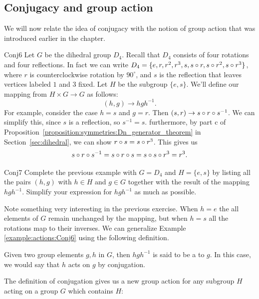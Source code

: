 \subsection{Conjugacy and group action}

We will now relate the idea of conjugacy with the notion of group action that was introduced earlier in the chapter.


\begin{example}{Conj6}
Let $G$ be the dihedral group $D_4$.  Recall that $D_4$ consists of four rotations and four reflections.  In fact we can write $D_4=\{e, r, r^2, r^3, s,s\circ r,s\circ r^2,s\circ r^3\}$, where $r$ is counterclockwise rotation by $90^{\circ}$, and $s$ is the reflection that leaves vertices labeled $1$ and $3$ fixed.  Let $H$ be the subgroup $\{e,s\}$.  
We'll define our mapping from $H\times G \rightarrow G$ as follows:
$$(h,g) \rightarrow hgh^{-1}. $$
For example, consider the case $h=s$ and $g=r$. Then $(s,r) \rightarrow s\circ r \circ s^{-1}$.  We can simplify this, since $s$ is a reflection, so $s^{-1}=s$.  furthermore, by part c of Proposition~\ref{proposition:symmetries:Dn_generator_theorem}  in Section~\ref{sec:dihedral}, we can show $r\circ s =s\circ r^3$.  This gives us
$$ s\circ r\circ s^{-1}=s\circ r\circ s=s\circ s\circ r^3=r^3.$$

\end {example}
\begin{exercise}{Conj7}
Complete the previous example with $G=D_4$ and $H=\{e,s\}$ by listing all the pairs $(h,g)$ with $h\in H$ and $g \in G$ together with the result of the mapping $hgh^{-1}$.  Simplify your expression for $hgh^{-1}$ as much as possible.
\end{exercise}
Note something very interesting in the previous exercise.  When $h=e$ the all elements of $G$ remain unchanged by the mapping, but when $h=s$ all the rotations map to their inverses.
 We can generalize Example \ref{example:actions:Conj6} using the following definition.

\begin{defn}
Given two group elements $g,h$ in $G$, then $hgh^{-1}$ is said to be a  to $g$. In this case, we would say that $h$ acts on $g$ by conjugation.
\end{defn}
The definition of conjugation gives us a new group action for any subgroup $H$ acting on a group $G$ which contains $H$:

